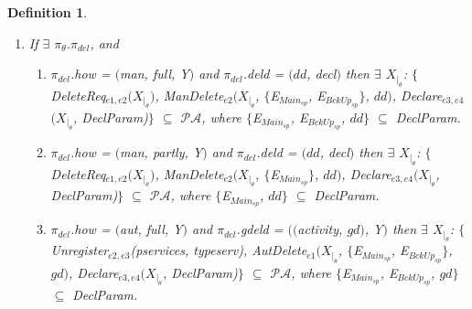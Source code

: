 \documentclass[a4paper]{article}
\newtheorem{ttd}{Definition}
\begin{document}
\begin{ttd}
\begin{enumerate}
\begin{enumerate}
\begin{itemize}
\end{itemize} 


\item $\pi_{str}$.\textit{storerev} = $($$[$t1, t2 $]$, \textit{places}, Y$)$ then $\exists$$X_{|_{\theta}}$, $\exists$$E_{e1}$, $E_{e2}$ $\in$ \textit{PartOf}($E_{sp}$), OWNER($X_{|_{\theta}}$) = $E_{e3}$ and $\{$\textit{Storerev}$_{e1}$($X_{|_{\theta}}$, $PL$, \textit{TT}), \textit{Declare}$_{e2,e3}$$(X_{|_{\theta}}$, \textit{DeclParam})$\}$ $\subseteq$ $\mathcal{P}\mathcal{A}$, where $PL$ $\subseteq$ \textit{DeclParam}, and $($$PL$ = \textit{places}$)$ and $($t1 $\leq$ \textit{TT} $\leq$ t2$)$.  
\end{enumerate}

\item If $\exists$ $\pi_{\theta}$.$\pi_{del}$, and 
\begin{enumerate}
\item $\pi_{del}$.\textit{how} = $($\textit{man}, \textit{full}, Y$)$ and $\pi_{del}$.\textit{deld} = $($$dd$, \textit{decl}$)$ then 
$\exists$ $X_{|_{\theta}}$: $\{$\textit{DeleteReq}$_{e1,e2}$$($$X_{|_{\theta}}$$)$, \textit{ManDelete}$_{e2}$$($$X_{|_{\theta}}$, $\{$E$_{Main_{sp}}$, E$_{BckUp_{sp}}$$\}$, $dd$$)$,  \textit{Declare}$_{e3,e4}$$(X_{|_{\theta}}$, \textit{DeclParam})$\}$ $\subseteq$ $\mathcal{P}\mathcal{A}$, where $\{$E$_{Main_{sp}}$, E$_{BckUp_{sp}}$, $dd$$\}$ $\subseteq$ \textit{DeclParam}. 

\item $\pi_{del}$.\textit{how} = $($\textit{man}, \textit{partly}, Y$)$ and $\pi_{del}$.\textit{deld} = $($$dd$, \textit{decl}$)$ then 
$\exists$ $X_{|_{\theta}}$: $\{$\textit{DeleteReq}$_{e1,e2}$$($$X_{|_{\theta}}$$)$, \textit{ManDelete}$_{e2}$$($$X_{|_{\theta}}$, $\{$E$_{Main_{sp}}$$\}$, $dd$$)$, \textit{Declare}$_{e3,e4}$$(X_{|_{\theta}}$, \textit{DeclParam})$\}$ $\subseteq$ $\mathcal{P}\mathcal{A}$, where  $\{$E$_{Main_{sp}}$, $dd$$\}$ $\subseteq$ \textit{DeclParam}.  



\item $\pi_{del}$.\textit{how} = $($\textit{aut}, \textit{full}, Y$)$ and $\pi_{del}$.\textit{gdeld} = $($$($\textit{activity}, $gd$$)$, Y$)$ then $\exists$ $X_{|_{\theta}}$:
$\{$\textit{Unregister}$_{e2,e3}$(\textit{pservices}, \textit{typeserv}), \textit{AutDelete}$_{e1}$$($$X_{|_{\theta}}$, $\{$E$_{Main_{sp}}$, E$_{BckUp_{sp}}$$\}$, $gd$$)$, \textit{Declare}$_{e3,e4}$$(X_{|_{\theta}}$, \textit{DeclParam})$\}$ $\subseteq$ $\mathcal{P}\mathcal{A}$, where $\{$E$_{Main_{sp}}$, E$_{BckUp_{sp}}$, $gd$$\}$ $\subseteq$ \textit{DeclParam}.


\end{enumerate}
\end{enumerate}
\end{ttd}
\end{document}
